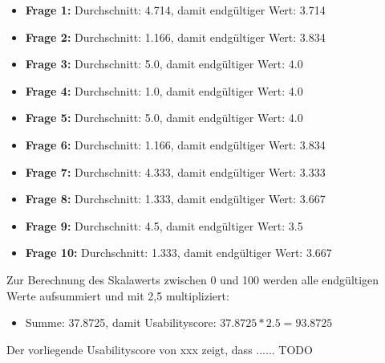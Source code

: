 		\begin{itemize}
			\item \textbf{Frage 1:} Durchschnitt: 4.714, damit endgültiger Wert: 3.714
			\item \textbf{Frage 2:} Durchschnitt: 1.166, damit endgültiger Wert: 3.834
			\item \textbf{Frage 3:} Durchschnitt: 5.0, damit endgültiger Wert: 4.0
			\item \textbf{Frage 4:} Durchschnitt: 1.0, damit endgültiger Wert: 4.0
			\item \textbf{Frage 5:} Durchschnitt: 5.0, damit endgültiger Wert: 4.0
			\item \textbf{Frage 6:} Durchschnitt: 1.166, damit endgültiger Wert: 3.834
			\item \textbf{Frage 7:} Durchschnitt: 4.333, damit endgültiger Wert: 3.333
			\item \textbf{Frage 8:} Durchschnitt: 1.333, damit endgültiger Wert: 3.667
			\item \textbf{Frage 9:} Durchschnitt: 4.5, damit endgültiger Wert: 3.5
			\item \textbf{Frage 10:} Durchschnitt: 1.333, damit endgültiger Wert: 3.667
		\end{itemize}
	
	Zur Berechnung des Skalawerts zwischen 0 und 100 werden alle endgültigen Werte aufsummiert und mit 2,5 multipliziert:
	
	\begin{itemize}
		\item Summe: 37.8725, damit Usabilityscore: $37.8725*2.5=93.8725$
	\end{itemize}

	Der vorliegende Usabilityscore von xxx zeigt, dass ...... TODO